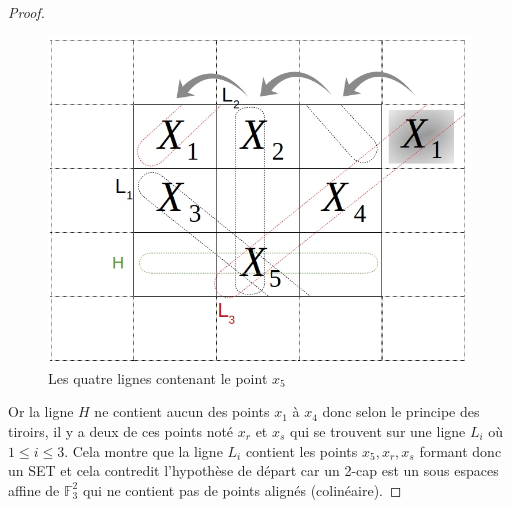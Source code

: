\documentclass[a4paper,12pt,titlepage]{article}
\theoremstyle{plain}
\theoremstyle{definition}
\begin{document}
\begin{proof}
  \begin{figure}[h!] %
    \centering
    \includegraphics[scale=0.4]{Fig2Prop1.jpg}
    \caption{Les quatre lignes contenant le point $x_5$}
  \end{figure}
  
  Or la ligne $H$ ne contient aucun des points $x_1$ à $x_4$ donc selon le principe des tiroirs, il y a deux de ces points noté $x_r$ et $x_s$ qui se trouvent sur une ligne $L_i$ où $1\le i \le 3$.
  Cela montre que la ligne $L_i$ contient les points $x_5, x_r, x_s$ formant donc un SET et cela contredit l'hypothèse de départ car un 2-cap est un sous espaces affine de $\mathbb{F}_3^2$ qui ne contient pas de points alignés (colinéaire).
\end{proof}
\end{document}
